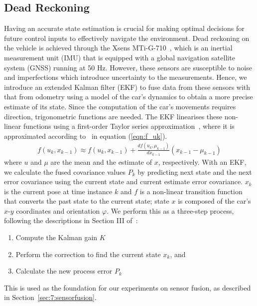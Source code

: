 \subsection{Dead Reckoning}\label{sec:7:dr}
Having an accurate state estimation is crucial for making optimal decisions for future control inputs to effectively navigate the environment. Dead reckoning on the vehicle is achieved through the Xsens MTi-G-710~\cite{xsens_mti-g-710_nodate}, which is an inertial measurement unit (IMU) that is equipped with a global navigation satellite system (GNSS) running at 50 Hz. However, these sensors are susceptible to noise and imperfections which introduce uncertainty to the measurements. Hence, we introduce an extended Kalman filter (EKF) to fuse data from these sensors with that from odometry using a model of the car's dynamics to obtain a more precise estimate of its state. Since the computation of the car's movements requires direction, trigonometric functions are needed. The EKF linearises these non-linear functions using a first-order Taylor series approximation~\cite{yu_derivation_nodate}, where it is approximated according to~\cite{morrell_extended_1997} in equation (\ref{eqn:f_uk}). 
\begin{align}\label{eqn:f_uk}
f(u_k,x_{k-1}) \approx f(u_k, x_{k-1}) + \frac{df(u_k, \mu_{k-1})}{dx_{k-1}}(x_{k-1} - \mu_{k-1})
\end{align}
where $u$ and $\mu$ are the mean and the estimate of $x$, respectively. With an EKF, we calculate the fused covariance values $P_k$ by predicting next state and the next error covariance using the current state and current estimate error covariance. $x_k$ is the current pose at time instance $k$ and $f$ is a non-linear transition function that converts the past state to the current state; state $x$ is composed of the car's $x$-$y$ coordinates and orientation $\varphi$. We perform this as a three-step process, following the descriptions in Section III of~\cite{moore_generalized_2016}:
\begin{enumerate}
	\item Compute the Kalman gain $K$
	\item Perform the correction to find the current state $x_k$, and
	\item Calculate the new process error $P_k$
\end{enumerate}
This is used as the foundation for our experiments on sensor fusion, as described in Section~\ref{sec:7:sensorfusion}.


